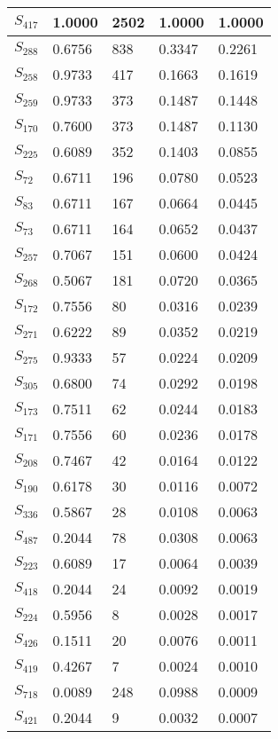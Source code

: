 \begin{xltabular}{\textwidth}{|X|X|X|X|X|}
        \hline
        \endlastfoot
    $S_{417}$ & 1.0000 & 2502 & 1.0000 & 1.0000 \\ \hline
 $S_{288}$ & 0.6756 & 838 & 0.3347 & 0.2261 \\ \hline
 $S_{258}$ & 0.9733 & 417 & 0.1663 & 0.1619 \\ \hline
 $S_{259}$ & 0.9733 & 373 & 0.1487 & 0.1448 \\ \hline
 $S_{170}$ & 0.7600 & 373 & 0.1487 & 0.1130 \\ \hline
 $S_{225}$ & 0.6089 & 352 & 0.1403 & 0.0855 \\ \hline
 $S_{72}$ & 0.6711 & 196 & 0.0780 & 0.0523 \\ \hline
 $S_{83}$ & 0.6711 & 167 & 0.0664 & 0.0445 \\ \hline
 $S_{73}$ & 0.6711 & 164 & 0.0652 & 0.0437 \\ \hline
 $S_{257}$ & 0.7067 & 151 & 0.0600 & 0.0424 \\ \hline
 $S_{268}$ & 0.5067 & 181 & 0.0720 & 0.0365 \\ \hline
 $S_{172}$ & 0.7556 & 80 & 0.0316 & 0.0239 \\ \hline
 $S_{271}$ & 0.6222 & 89 & 0.0352 & 0.0219 \\ \hline
 $S_{275}$ & 0.9333 & 57 & 0.0224 & 0.0209 \\ \hline
 $S_{305}$ & 0.6800 & 74 & 0.0292 & 0.0198 \\ \hline
 $S_{173}$ & 0.7511 & 62 & 0.0244 & 0.0183 \\ \hline
 $S_{171}$ & 0.7556 & 60 & 0.0236 & 0.0178 \\ \hline
 $S_{208}$ & 0.7467 & 42 & 0.0164 & 0.0122 \\ \hline
 $S_{190}$ & 0.6178 & 30 & 0.0116 & 0.0072 \\ \hline
 $S_{336}$ & 0.5867 & 28 & 0.0108 & 0.0063 \\ \hline
 $S_{487}$ & 0.2044 & 78 & 0.0308 & 0.0063 \\ \hline
 $S_{223}$ & 0.6089 & 17 & 0.0064 & 0.0039 \\ \hline
 $S_{418}$ & 0.2044 & 24 & 0.0092 & 0.0019 \\ \hline
 $S_{224}$ & 0.5956 & 8 & 0.0028 & 0.0017 \\ \hline
 $S_{426}$ & 0.1511 & 20 & 0.0076 & 0.0011 \\ \hline
 $S_{419}$ & 0.4267 & 7 & 0.0024 & 0.0010 \\ \hline
 $S_{718}$ & 0.0089 & 248 & 0.0988 & 0.0009 \\ \hline
 $S_{421}$ & 0.2044 & 9 & 0.0032 & 0.0007 \\ \hline

\end{xltabular}
